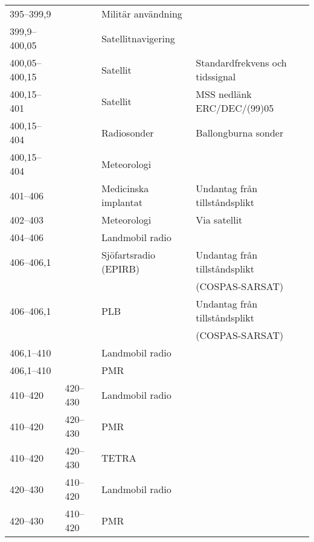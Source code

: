\begin{landscape}
\begin{longtable}{llll}
	395--399,9         &                    & Militär användning      &  \\
	399,9--400,05      &                    & Satellitnavigering      &  \\
	400,05--400,15     &                    & Satellit                & Standardfrekvens och tidssignal          \\
	400,15--401        &                    & Satellit                & MSS nedlänk ERC/DEC/(99)05               \\
	400,15--404        &                    & Radiosonder             & Ballongburna sonder                      \\
	400,15--404        &                    & Meteorologi             &  \\
	401--406           &                    & Medicinska implantat    & Undantag från tillståndsplikt            \\
	402--403           &                    & Meteorologi             & Via satellit                             \\
	404--406           &                    & Landmobil radio         &  \\
	406--406,1         &                    & Sjöfartsradio (EPIRB)   & Undantag från tillståndsplikt            \\
	                   &                    &                         & (COSPAS-SARSAT)                          \\
	406--406,1         &                    & PLB                     & Undantag från tillståndsplikt            \\
	                   &                    &                         & (COSPAS-SARSAT)                          \\
	406,1--410         &                    & Landmobil radio         &  \\
	406,1--410         &                    & PMR                     &  \\
	410--420           & 420--430           & Landmobil radio         &  \\
	410--420           & 420--430           & PMR                     &  \\
	410--420           & 420--430           & TETRA                   &  \\
	420--430           & 410--420           & Landmobil radio         &  \\
	420--430           & 410--420           & PMR                     &  \\

\end{longtable}
\end{landscape}
